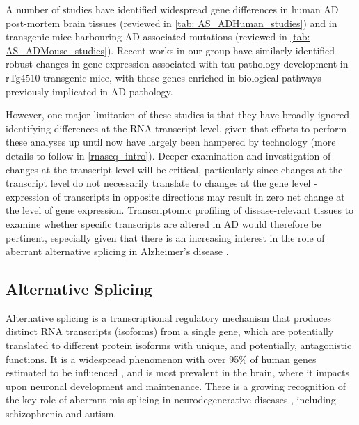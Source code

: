 A number of studies have identified widespread gene differences in human AD post-mortem brain tissues (reviewed in \cref{tab: AS_ADHuman_studies}) and in transgenic mice harbouring AD-associated mutations (reviewed in \cref{tab: AS_ADMouse_studies}). Recent works in our group have similarly identified robust changes in gene expression associated with tau pathology development in rTg4510 transgenic mice, with these genes enriched in biological pathways previously implicated in AD pathology\cite{Castanho2020}. 

However, one major limitation of these studies is that they have broadly ignored identifying differences at the RNA transcript level, given that efforts to perform these analyses up until now have largely been hampered by technology (more details to follow in \cref{rnaseq_intro}). Deeper examination and investigation of changes at the transcript level will be critical, particularly since changes at the transcript level do not necessarily translate to changes at the gene level - expression of transcripts in opposite directions may result in zero net change at the level of gene expression. Transcriptomic profiling of disease-relevant tissues to examine whether specific transcripts are altered in AD would therefore be pertinent, especially given that there is an increasing interest in the role of aberrant alternative splicing in Alzheimer's disease \cite{Raj2018}.

\subsection{Alternative Splicing}\label{intro:AS}
Alternative splicing is a transcriptional regulatory mechanism that produces distinct RNA transcripts (isoforms) from a single gene, which are potentially translated to different protein isoforms with unique, and potentially, antagonistic functions\cite{Wang2008}. It is a widespread phenomenon with over 95\% of human genes estimated to be influenced \cite{Pan2008}, and is most prevalent in the brain\cite{Yeo2004}, where it impacts upon neuronal development and maintenance\cite{Pan2008, Mazin2014, Raj2015}. There is a growing recognition of the key role of aberrant mis-splicing in neurodegenerative diseases \cite{Gandal2018,RL2019}, including schizophrenia and autism. 

